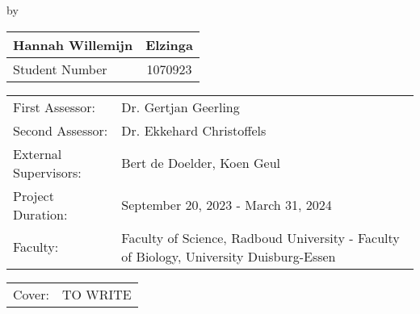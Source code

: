 \begin{titlepage}

\begin{center}

{\makeatletter
\largetitlestyle\fontsize{45}{45}\selectfont\@title
\makeatother}

{\makeatletter
\ifdefvoid{\@subtitle}{}{\bigskip\titlestyle\fontsize{20}{20}\selectfont\@subtitle}
\makeatother}

\bigskip
\bigskip

by

\bigskip
\bigskip

{\makeatletter
\largetitlestyle\fontsize{25}{25}\selectfont\@author
\makeatother}

\bigskip
\bigskip

\setlength\extrarowheight{2pt}
\begin{tabular}{lc}
    Hannah Willemijn &Elzinga \\\midrule
    Student Number & 1070923 \\
\end{tabular}

\vfill

\begin{tabular}{ll}
    First Assessor: & Dr. Gertjan Geerling\\
    Second Assessor: & Dr. Ekkehard Christoffels \\
    External Supervisors: & Bert de Doelder, Koen Geul\\
    Project Duration: & September 20, 2023 - March 31, 2024 \\
    Faculty: & Faculty of Science, Radboud University - Faculty of Biology, University Duisburg-Essen \\
\end{tabular}

\bigskip
\bigskip

\begin{tabular}{p{15mm}p{10cm}}
    Cover: & TO WRITE\\
\end{tabular}

\end{center}

\end{titlepage}

